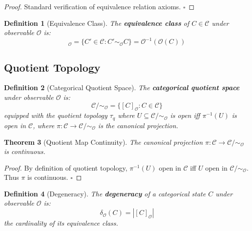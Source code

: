 \documentclass[12pt,a4paper]{article}
\newtheorem{theorem}{Theorem}[section]
\newtheorem{definition}[theorem]{Definition}
\begin{document}
\begin{proof}
Standard verification of equivalence relation axioms. $\square$
\end{proof}

\begin{definition}[Equivalence Class]
\label{def:equivalence_class}
The \textbf{equivalence class} of $C \in \mathcal{C}$ under observable $\mathcal{O}$ is:
\begin{equation}
[C]_{\mathcal{O}} = \{C' \in \mathcal{C} : C' \sim_{\mathcal{O}} C\} = \mathcal{O}^{-1}(\mathcal{O}(C))
\end{equation}
\end{definition}

\subsection{Quotient Topology}

\begin{definition}[Categorical Quotient Space]
\label{def:quotient_space}
The \textbf{categorical quotient space} under observable $\mathcal{O}$ is:
\begin{equation}
\mathcal{C}/{\sim_{\mathcal{O}}} = \{[C]_{\mathcal{O}} : C \in \mathcal{C}\}
\end{equation}
equipped with the quotient topology $\tau_q$ where $U \subseteq \mathcal{C}/{\sim_{\mathcal{O}}}$ is open iff $\pi^{-1}(U)$ is open in $\mathcal{C}$, where $\pi: \mathcal{C} \to \mathcal{C}/{\sim_{\mathcal{O}}}$ is the canonical projection.
\end{definition}

\begin{theorem}[Quotient Map Continuity]
\label{thm:quotient_continuous}
The canonical projection $\pi: \mathcal{C} \to \mathcal{C}/{\sim_{\mathcal{O}}}$ is continuous.
\end{theorem}

\begin{proof}
By definition of quotient topology, $\pi^{-1}(U)$ open in $\mathcal{C}$ iff $U$ open in $\mathcal{C}/{\sim_{\mathcal{O}}}$. Thus $\pi$ is continuous. $\square$
\end{proof}

\begin{definition}[Degeneracy]
\label{def:degeneracy}
The \textbf{degeneracy} of a categorical state $C$ under observable $\mathcal{O}$ is:
\begin{equation}
\delta_{\mathcal{O}}(C) = |[C]_{\mathcal{O}}|
\end{equation}
the cardinality of its equivalence class.
\end{definition}
\end{document}
